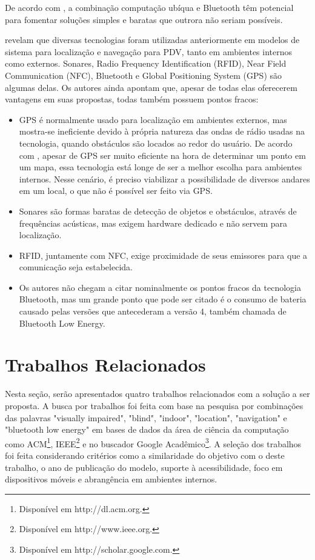 \documentclass[twoside,english,brazilian]{UNISINOSartigo}
\begin{document}
De acordo com , a combinação computação ubíqua e Bluetooth têm potencial para fomentar soluções simples e baratas que outrora não seriam possíveis.

 revelam que diversas tecnologias foram utilizadas anteriormente em modelos de sistema para localização e navegação para PDV, tanto em ambientes internos como externos. Sonares, Radio Frequency Identification (RFID), Near Field Communication (NFC), Bluetooth e Global Positioning System (GPS) são algumas delas. Os autores ainda apontam que, apesar de todas elas oferecerem vantagens em suas propostas, todas também possuem pontos fracos:

\begin{itemize}
  \item GPS é normalmente usado para localização em ambientes externos, mas mostra-se ineficiente devido à própria natureza das ondas de rádio usadas na tecnologia, quando obstáculos são locados ao redor do usuário. De acordo com , apesar de GPS ser muito eficiente na hora de determinar um ponto em um mapa, essa tecnologia está longe de ser a melhor escolha para ambientes internos. Nesse cenário, é preciso viabilizar a possibilidade de diversos andares em um local, o que não é possível ser feito via GPS.
  \item Sonares são formas baratas de detecção de objetos e obstáculos, através de frequências acústicas, mas exigem hardware dedicado e não servem para localização.
  \item RFID, juntamente com NFC, exige proximidade de seus emissores para que a comunicação seja estabelecida.
  \item Os autores não chegam a citar nominalmente os pontos fracos da tecnologia Bluetooth, mas um grande ponto que pode ser citado é o consumo de bateria causado pelas versões que antecederam a versão 4, também chamada de Bluetooth Low Energy.
\end{itemize}

\section{Trabalhos Relacionados}\label{cap:trabalhosRelacionados}
Nesta seção, serão apresentados quatro trabalhos relacionados com a solução a ser proposta. A busca por trabalhos foi feita com base na pesquisa por combinações das palavras "visually impaired", "blind", "indoor", "location", "navigation" e "bluetooth low energy" em bases de dados da área de ciência da computação como ACM\footnote{Disponível em http://dl.acm.org.}, IEEE\footnote{Disponível em http://www.ieee.org.} e no buscador Google Acadêmico\footnote{Disponível em http://scholar.google.com.}. A seleção dos trabalhos foi feita considerando critérios como a similaridade do objetivo com o deste trabalho, o ano de publicação do modelo, suporte à acessibilidade, foco em dispositivos móveis e abrangência em ambientes internos. 
\end{document}
